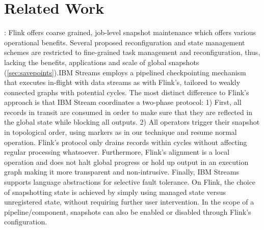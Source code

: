 
\section{Related Work}
\label{sec:related}
: Flink offers coarse grained, job-level snapshot maintenance which offers various operational benefits. Several proposed reconfiguration and state management schemes \cite{castro2013integrating} are restricted to fine-grained task management and reconfiguration, thus, lacking the benefits, applications and scale of global snapshots (\autoref{sec:savepoints}).IBM Streams employs a pipelined checkpointing mechanism \cite{jacques2016consistent} that executes in-flight with data streams as with Flink's, tailored to weakly connected graphs with potential cycles. The most distinct difference to Flink's approach is that IBM Stream coordinates a two-phase protocol: 1) First, all records in transit are consumed in order to make sure that they are reflected in the global state while blocking all outputs. 2) All operators trigger their snapshot in topological order, using markers as in our technique and resume normal operation. Flink's protocol only drains records within cycles without affecting regular processing whatsoever. Furthermore, Flink's alignment is a local operation and does not halt global progress or hold up output in an execution graph making it more transparent and non-intrusive. Finally, IBM Streams supports language abstractions for selective fault tolerance. On Flink, the choice of snapshotting state is achieved by simply using managed state versus unregistered state, without requiring further user intervention. In the scope of a pipeline/component, snapshots can also be enabled or disabled through Flink's configuration. 

